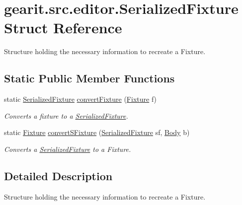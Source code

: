 \hypertarget{structgearit_1_1src_1_1editor_1_1_serialized_fixture}{\section{gearit.\+src.\+editor.\+Serialized\+Fixture Struct Reference}
\label{structgearit_1_1src_1_1editor_1_1_serialized_fixture}
}


Structure holding the necessary information to recreate a Fixture.  


\subsection*{Static Public Member Functions}
\begin{DoxyCompactItemize}
\item 
static \hyperlink{structgearit_1_1src_1_1editor_1_1_serialized_fixture}{Serialized\+Fixture} \hyperlink{structgearit_1_1src_1_1editor_1_1_serialized_fixture_ae34535bb006470e00a76aafd6515071f}{convert\+Fixture} (\hyperlink{class_farseer_physics_1_1_dynamics_1_1_fixture}{Fixture} f)
\begin{DoxyCompactList}\small\item\em Converts a fixture to a \hyperlink{structgearit_1_1src_1_1editor_1_1_serialized_fixture}{Serialized\+Fixture}. \end{DoxyCompactList}\item 
static \hyperlink{class_farseer_physics_1_1_dynamics_1_1_fixture}{Fixture} \hyperlink{structgearit_1_1src_1_1editor_1_1_serialized_fixture_a46ee00b30ecf8c8e1fa741146ac3d705}{convert\+S\+Fixture} (\hyperlink{structgearit_1_1src_1_1editor_1_1_serialized_fixture}{Serialized\+Fixture} sf, \hyperlink{class_farseer_physics_1_1_dynamics_1_1_body}{Body} b)
\begin{DoxyCompactList}\small\item\em Converts a \hyperlink{structgearit_1_1src_1_1editor_1_1_serialized_fixture}{Serialized\+Fixture} to a Fixture. \end{DoxyCompactList}\end{DoxyCompactItemize}


\subsection{Detailed Description}
Structure holding the necessary information to recreate a Fixture. 



